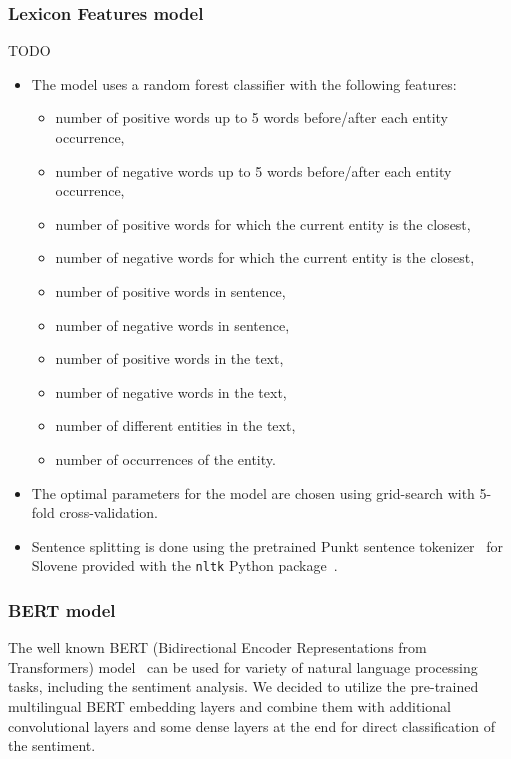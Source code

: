 \documentclass[11pt,a4paper]{article}
\begin{document}
\subsubsection{Lexicon Features model}

TODO
\begin{itemize}
    \item The model uses a random forest classifier with the following features:
    \begin{itemize}
        \item number of positive words up to 5 words before/after each entity occurrence,
        \item number of negative words up to 5 words before/after each entity occurrence,
        \item number of positive words for which the current entity is the closest,
        \item number of negative words for which the current entity is the closest,
        \item number of positive words in sentence,
        \item number of negative words in sentence,
        \item number of positive words in the text,
        \item number of negative words in the text,
        \item number of different entities in the text,
        \item number of occurrences of the entity.
    \end{itemize}
    \item The optimal parameters for the model are chosen using grid-search with 5-fold cross-validation.
    \item Sentence splitting is done using the pretrained Punkt sentence tokenizer~\cite{kiss2006unsupervised} for Slovene provided with the \texttt{nltk} Python package~\cite{bird2009natural}.
\end{itemize}

\subsubsection{BERT model}

The well known BERT (Bidirectional Encoder Representations from Transformers) model~\cite{devlin2018bert} can be used for variety of natural language processing tasks, including the sentiment analysis.
We decided to utilize the pre-trained multilingual BERT embedding layers and combine them with additional convolutional layers and some dense layers at the end for direct classification of the sentiment.
\end{document}
